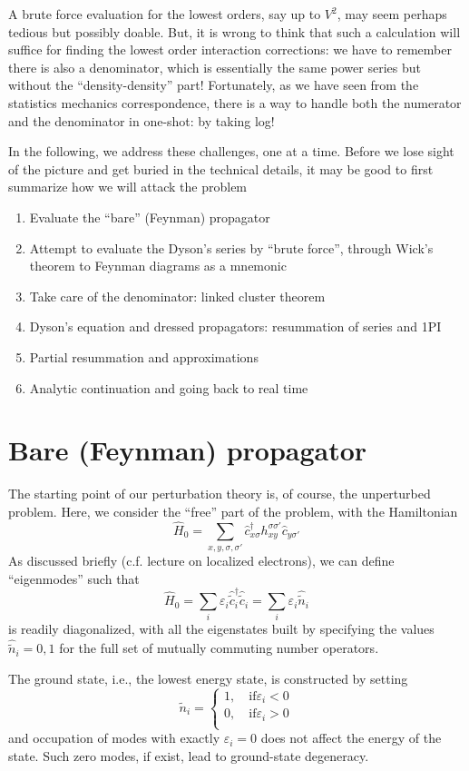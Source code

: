 A brute force evaluation for the lowest orders, say up to $V^2$, may seem perhaps tedious but possibly doable. But, it is wrong to think that such a calculation will suffice for finding the lowest order interaction corrections: we have to remember there is also a denominator, which is essentially the same power series but without the ``density-density'' part! Fortunately, as we have seen from the statistics mechanics correspondence, there is a way to handle both the numerator and the denominator in one-shot: by taking log!

In the following, we address these challenges, one at a time. Before we lose sight of the picture and get buried in the technical details, it may be good to first summarize how we will attack the problem

\begin{enumerate}
    \item Evaluate the ``bare'' (Feynman) propagator
    \item Attempt to evaluate the Dyson's series by ``brute force'', through Wick's theorem to Feynman diagrams as a mnemonic
    \item Take care of the denominator: linked cluster theorem
    \item Dyson's equation and dressed propagators: resummation of series and 1PI
    \item Partial resummation and approximations
    \item Analytic continuation and going back to real time
\end{enumerate}

\section{Bare (Feynman) propagator}

The starting point of our perturbation theory is, of course, the unperturbed problem. Here, we consider the ``free'' part of the problem, with the Hamiltonian
\[ \hat{H}_0=\sum_{x,y,\sigma ,\sigma '}{\hat{c}_{x\sigma}^{\dagger}h_{xy}^{\sigma \sigma '}\hat{c}_{y\sigma '}}\]
As discussed briefly (c.f. lecture on localized electrons), we can define ``eigenmodes'' such that
\[ \hat{H}_0=\sum_i{\varepsilon _i\hat{\tilde{c}}_{i}^{\dagger}\hat{\tilde{c}}_i}=\sum_i{\varepsilon _i\hat{\tilde{n}}_i}\]
is readily diagonalized, with all the eigenstates built by specifying the values $\hat{\tilde{n}}_i=0,1$ for the full set of mutually commuting number operators.

The ground state, i.e., the lowest energy state, is constructed by setting
\[ \tilde{n}_i=\begin{cases}
	1,\quad \mathrm{if} \varepsilon _i<0\\
	0,\quad \mathrm{if} \varepsilon _i>0\\
\end{cases}\]
and occupation of modes with exactly $\varepsilon _i=0$ does not affect the energy of the state. Such zero modes, if exist, lead to ground-state degeneracy.

